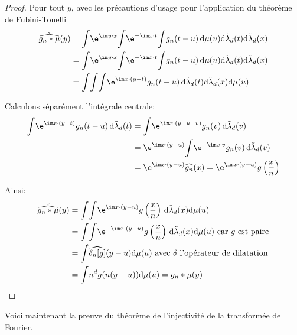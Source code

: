 \begin{proof}
Pour tout $y$, avec les précautions d'usage pour l'application du théorème de Fubini-Tonelli
\begin{align*}
\check{\widehat{g_n*\mu}}(y) & = \displaystyle{\int} \e^{\im y \cdot x} \displaystyle{\int} \e^{-\im x \cdot t} \displaystyle{\int} g_n(t-u) \, \mathrm d \mu(u) \mathrm d \tilde{\lambda}_d(t) \mathrm d \tilde{\lambda}_d(x) \\
 & = \displaystyle{\int} \e^{\im y \cdot x} \displaystyle{\int} \e^{-\im x \cdot t} \displaystyle{\int} g_n(t-u) \, \mathrm d \mu(u) \mathrm d \tilde{\lambda}_d(t) \mathrm d \tilde{\lambda}_d(x) \\
 & = \displaystyle{\int}  \displaystyle{\int}  \displaystyle{\int} \e^{\im x \cdot (y-t)} g_n(t-u) \,  \mathrm d \tilde{\lambda}_d(t) \mathrm d \tilde{\lambda}_d(x) \mathrm d \mu(u)
\end{align*}

Calculons séparément l'intégrale centrale:
\begin{align*}
\displaystyle{\int} \e^{\im x \cdot (y-t)} g_n(t-u) \,  \mathrm d \tilde{\lambda}_d(t) & = \displaystyle{\int} \e^{\im x \cdot (y-u-v)} g_n(v) \,  \mathrm d \tilde{\lambda}_d(v) \\
 & = \e^{\im x \cdot (y-u)} \displaystyle{\int} \e^{-\im x \cdot v} g_n(v) \,  \mathrm d \tilde{\lambda}_d(v) \\
 & = \e^{\im x \cdot (y-u)} \widehat{g_n}(x) = \e^{\im x \cdot (y-u)} g\left ( \frac{x}{n}\right )
\end{align*}

Ainsi:
\begin{align*}
\check{\widehat{g_n*\mu}}(y) & = \displaystyle{\int}  \displaystyle{\int}  \e^{\im x \cdot (y-u)} g\left ( \frac{x}{n}\right )  \, \mathrm d \tilde{\lambda}_d(x) \mathrm d \mu(u) \\
 & = \displaystyle{\int}  \displaystyle{\int}  \e^{-\im x \cdot (y-u)} g\left ( \frac{x}{n}\right )  \, \mathrm d \tilde{\lambda}_d(x) \mathrm d \mu(u) \text{ car $g$ est paire}\\
  & = \displaystyle{\int}   \widehat{\delta_{n}[g]}(y-u)  \mathrm d \mu(u) \text{ avec }\delta\text{ l'opérateur de dilatation}\\
  & = \displaystyle{\int} n^d g(n(y-u)) \mathrm d \mu(u) = g_n*\mu(y)
\end{align*}
\end{proof}

Voici maintenant la preuve du théorème de l'injectivité de la transformée de Fourier.

